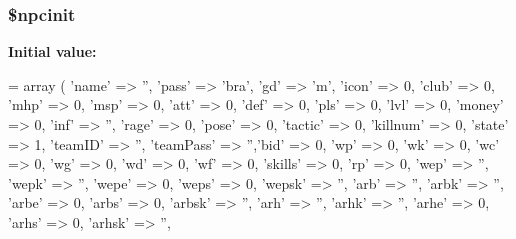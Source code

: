 \hypertarget{npc__1_8php_a38bd0e87b769bab492d83ad186789abd}{
\subsubsection[{\$npcinit}]{\setlength{\rightskip}{0pt plus 5cm}\$npcinit}}\label{npc__1_8php_a38bd0e87b769bab492d83ad186789abd}
{\bfseries Initial value\+:}
\begin{DoxyCode}
= array
    (
        \textcolor{stringliteral}{'name'} => \textcolor{stringliteral}{''},   \textcolor{stringliteral}{'pass'} => \textcolor{stringliteral}{'bra'}, \textcolor{stringliteral}{'gd'} => \textcolor{charliteral}{'m'},   \textcolor{stringliteral}{'icon'} => 0,    \textcolor{stringliteral}{'club'} => 0,    
        \textcolor{stringliteral}{'mhp'} => 0, \textcolor{stringliteral}{'msp'} => 0, \textcolor{stringliteral}{'att'} => 0, \textcolor{stringliteral}{'def'} => 0, \textcolor{stringliteral}{'pls'} => 0, \textcolor{stringliteral}{'lvl'} => 0,
        \textcolor{stringliteral}{'money'} => 0,   \textcolor{stringliteral}{'inf'} => \textcolor{stringliteral}{''},    \textcolor{stringliteral}{'rage'} => 0,    \textcolor{stringliteral}{'pose'} => 0,    \textcolor{stringliteral}{'tactic'} => 0,  
        \textcolor{stringliteral}{'killnum'} => 0, \textcolor{stringliteral}{'state'} => 1,   \textcolor{stringliteral}{'teamID'} => \textcolor{stringliteral}{''}, \textcolor{stringliteral}{'teamPass'} => \textcolor{stringliteral}{''},\textcolor{stringliteral}{'bid'} => 0,
        \textcolor{stringliteral}{'wp'} => 0, \textcolor{stringliteral}{'wk'} => 0, \textcolor{stringliteral}{'wc'} => 0, \textcolor{stringliteral}{'wg'} => 0, \textcolor{stringliteral}{'wd'} => 0, \textcolor{stringliteral}{'wf'} => 0, \textcolor{stringliteral}{'skills'} => 0, \textcolor{stringliteral}{'rp'} => 0,
        \textcolor{stringliteral}{'wep'} => \textcolor{stringliteral}{''},    \textcolor{stringliteral}{'wepk'} => \textcolor{stringliteral}{''},   \textcolor{stringliteral}{'wepe'} => 0,    \textcolor{stringliteral}{'weps'} => 0,    \textcolor{stringliteral}{'wepsk'} => \textcolor{stringliteral}{''},
        \textcolor{stringliteral}{'arb'} => \textcolor{stringliteral}{''},    \textcolor{stringliteral}{'arbk'} => \textcolor{stringliteral}{''},   \textcolor{stringliteral}{'arbe'} => 0,    \textcolor{stringliteral}{'arbs'} => 0,    \textcolor{stringliteral}{'arbsk'} => \textcolor{stringliteral}{''},
        \textcolor{stringliteral}{'arh'} => \textcolor{stringliteral}{''},    \textcolor{stringliteral}{'arhk'} => \textcolor{stringliteral}{''},   \textcolor{stringliteral}{'arhe'} => 0,    \textcolor{stringliteral}{'arhs'} => 0,    \textcolor{stringliteral}{'arhsk'} => \textcolor{stringliteral}{''},

\end{DoxyCode}
